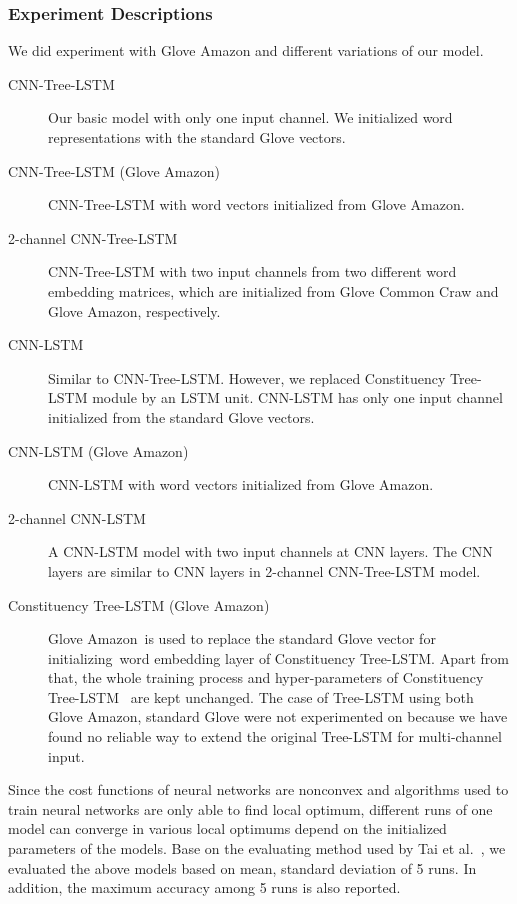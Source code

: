 \subsubsection{Experiment Descriptions}
We did experiment with Glove Amazon and different variations of our model.
\begin{description}
	\item[CNN-Tree-LSTM] Our basic model with only one input channel.
	We initialized word representations with the standard Glove vectors.
	\item[CNN-Tree-LSTM (Glove Amazon)] CNN-Tree-LSTM with word vectors initialized from Glove Amazon.
	\item [2-channel CNN-Tree-LSTM] CNN-Tree-LSTM with two input channels from two different word embedding matrices, which are initialized from Glove Common Craw and Glove Amazon, respectively.
	\item[CNN-LSTM] Similar to CNN-Tree-LSTM. However, we replaced Constituency Tree-LSTM module by an LSTM unit.
	CNN-LSTM has only one input channel initialized from the standard Glove vectors.
	\item [CNN-LSTM (Glove Amazon)] CNN-LSTM with word vectors initialized from Glove Amazon.
	\item [2-channel CNN-LSTM] A CNN-LSTM model with two input channels at CNN layers. The CNN layers are similar to CNN layers in 2-channel CNN-Tree-LSTM model.
	\item[Constituency Tree-LSTM (Glove Amazon)]Glove Amazon~is used to replace the standard Glove vector for initializing~word embedding layer of Constituency Tree-LSTM.
	Apart from that, the whole training process and hyper-parameters of Constituency Tree-LSTM~\cite{treeLSTM} are kept unchanged.
	The case of Tree-LSTM using both Glove Amazon, standard Glove were not experimented on because we have found no reliable way to extend the original Tree-LSTM for multi-channel input.
\end{description}

Since the cost functions of neural networks are nonconvex and algorithms used to train neural networks are only able to find local optimum, different runs of one model can converge in various local optimums depend on the initialized parameters of the models.
Base on the evaluating method used by Tai et al.~\cite{treeLSTM}, we evaluated the above models based on mean, standard deviation of 5 runs.
In addition, the maximum accuracy among 5 runs is also reported.

